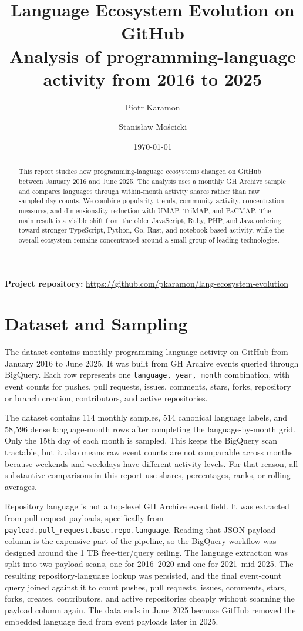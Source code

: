 \documentclass[11pt,a4paper]{article}
\title{\textbf{Language Ecosystem Evolution on GitHub}\\
\large Analysis of programming-language activity from 2016 to 2025}
\author{Piotr Karamon \and Stanisław Mościcki}
\date{\today}
\newcommand{\projectrepo}{https://github.com/pkaramon/lang-ecosystem-evolution}
\begin{document}
\maketitle

\begin{abstract}
This report studies how programming-language ecosystems changed on GitHub between January 2016 and June 2025. The analysis uses a monthly GH Archive sample and compares languages through within-month activity shares rather than raw sampled-day counts. We combine popularity trends, community activity, concentration measures, and dimensionality reduction with UMAP, TriMAP, and PaCMAP. The main result is a visible shift from the older JavaScript, Ruby, PHP, and Java ordering toward stronger TypeScript, Python, Go, Rust, and notebook-based activity, while the overall ecosystem remains concentrated around a small group of leading technologies.
\end{abstract}

\medskip
\noindent\textbf{Project repository:} \href{\projectrepo}{\projectrepo}

\section{Dataset and Sampling}

The dataset contains monthly programming-language activity on GitHub from January 2016 to June 2025. It was built from GH Archive events queried through BigQuery. Each row represents one \texttt{language, year, month} combination, with event counts for pushes, pull requests, issues, comments, stars, forks, repository or branch creation, contributors, and active repositories.

The dataset contains 114 monthly samples, 514 canonical language labels, and 58,596 dense language-month rows after completing the language-by-month grid. Only the 15th day of each month is sampled. This keeps the BigQuery scan tractable, but it also means raw event counts are not comparable across months because weekends and weekdays have different activity levels. For that reason, all substantive comparisons in this report use shares, percentages, ranks, or rolling averages.

Repository language is not a top-level GH Archive event field. It was extracted from pull request payloads, specifically from \texttt{payload.pull\_request.base.repo.language}. Reading that JSON payload column is the expensive part of the pipeline, so the BigQuery workflow was designed around the 1 TB free-tier/query ceiling. The language extraction was split into two payload scans, one for 2016--2020 and one for 2021--mid-2025. The resulting repository-language lookup was persisted, and the final event-count query joined against it to count pushes, pull requests, issues, comments, stars, forks, creates, contributors, and active repositories cheaply without scanning the payload column again. The data ends in June 2025 because GitHub removed the embedded language field from event payloads later in 2025.
\end{document}
